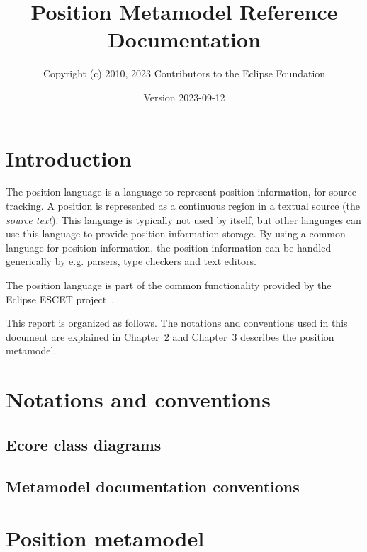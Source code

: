 \documentclass{report}
\title{Position Metamodel Reference Documentation}
\author{Copyright (c) 2010, 2023 Contributors to the Eclipse Foundation}
\date{Version 2023-09-12}
\begin{document}
\maketitle
\tableofcontents

\chapter{Introduction}
The position language is a language to represent position information, for
source tracking. A position is represented as a continuous region in a textual
source (the \emph{source text}). This language is typically not used by itself,
but other languages can use this language to provide position information
storage. By using a common language for position information, the position
information can be handled generically by e.g. parsers, type checkers and text
editors.

The position language is part of the common functionality provided by the
Eclipse ESCET\textsuperscript{\texttrademark{}} project~\cite{Eclipse:ESCET}.



This report is organized as follows. The notations and conventions used in
this document are explained in Chapter~\ref{ch:notations-conventions} and
Chapter~\ref{ch:position} describes the position metamodel.


\chapter{Notations and conventions}\label{ch:notations-conventions}

\section{Ecore class diagrams}




\section{Metamodel documentation conventions}




\chapter{Position metamodel}\label{ch:position}
\end{document}
